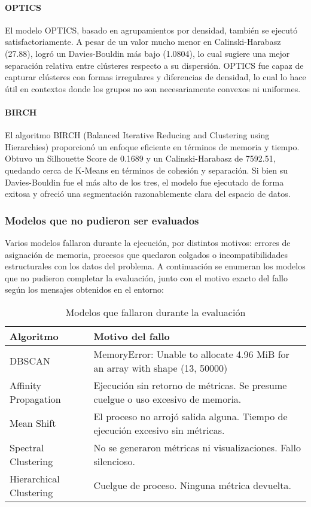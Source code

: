 \documentclass[conference]{IEEEtran}
\begin{document}
\paragraph{OPTICS}
El modelo OPTICS, basado en agrupamientos por densidad, también se ejecutó satisfactoriamente. A pesar de un valor mucho menor en Calinski-Harabasz (27.88), logró un Davies-Bouldin más bajo (1.0804), lo cual sugiere una mejor separación relativa entre clústeres respecto a su dispersión. OPTICS fue capaz de capturar clústeres con formas irregulares y diferencias de densidad, lo cual lo hace útil en contextos donde los grupos no son necesariamente convexos ni uniformes.

\paragraph{BIRCH}
El algoritmo BIRCH (Balanced Iterative Reducing and Clustering using Hierarchies) proporcionó un enfoque eficiente en términos de memoria y tiempo. Obtuvo un Silhouette Score de 0.1689 y un Calinski-Harabasz de 7592.51, quedando cerca de K-Means en términos de cohesión y separación. Si bien su Davies-Bouldin fue el más alto de los tres, el modelo fue ejecutado de forma exitosa y ofreció una segmentación razonablemente clara del espacio de datos.

\subsubsection{Modelos que no pudieron ser evaluados}

Varios modelos fallaron durante la ejecución, por distintos motivos: errores de asignación de memoria, procesos que quedaron colgados o incompatibilidades estructurales con los datos del problema. A continuación se enumeran los modelos que no pudieron completar la evaluación, junto con el motivo exacto del fallo según los mensajes obtenidos en el entorno:

\begin{table}[h]
\caption{Modelos que fallaron durante la evaluación}
\centering
\begin{tabular}{|l|p{5cm}|}
\hline
\textbf{Algoritmo} & \textbf{Motivo del fallo} \\
\hline
DBSCAN & MemoryError: Unable to allocate 4.96 MiB for an array with shape (13, 50000) \\
\hline
Affinity Propagation & Ejecución sin retorno de métricas. Se presume cuelgue o uso excesivo de memoria. \\
\hline
Mean Shift & El proceso no arrojó salida alguna. Tiempo de ejecución excesivo sin métricas. \\
\hline
Spectral Clustering & No se generaron métricas ni visualizaciones. Fallo silencioso. \\
\hline
Hierarchical Clustering & Cuelgue de proceso. Ninguna métrica devuelta. \\
\hline
\end{tabular}
\label{tab:failed_models}
\end{table}
\end{document}
